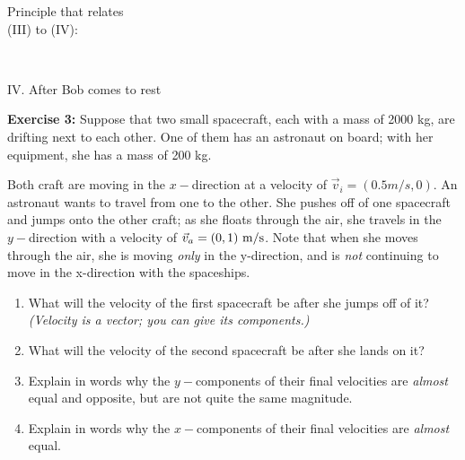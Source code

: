 \documentclass[12pt]{article}
\begin{document}
\begin{minipage}{2in}
	\begin{center}
		\vspace{1.5in}
		Principle that relates\\ (III) to (IV):
	\end{center}
\end{minipage}\\
	\begin{minipage}{5in}
	\begin{framed}
		IV. After Bob comes to rest
		\vspace{1.8in}
	\end{framed}
\end{minipage}
\begin{minipage}{2in}
	\begin{center}
		\vspace{1.5in}
		
	\end{center}
\end{minipage}



\vspace{0.5in}

{\bf Exercise 3:} Suppose that two small spacecraft, each with a mass of 2000 kg, are drifting next to each other. One of them has an astronaut on board; with her equipment, she has a mass of 200 kg. 

	Both craft are moving in the $x-$direction at a velocity of $\vec v_i = (0.5 m/s, 0)$. An astronaut wants to travel from one to the other. She pushes off of one spacecraft and jumps onto the other craft; as she floats through the air, she travels in the $y-$direction with a velocity of $\vec v_a = (0, 1) ~\rm m/\rm s$. Note that when she moves through the air, she is moving {\it only} in the y-direction, and is {\it not} continuing to move in the x-direction with the spaceships.


		\begin{enumerate}
			\item What will the velocity of the first spacecraft be after she jumps off of it? {\it (Velocity is a vector; you can give its components.)}
			
			\vspace{2.5in}\newpage
			
			\item What will the velocity of the second spacecraft be after she lands on it?
			
			\vspace{3.5in}
			
			\item Explain in words why the $y-$components of their final velocities are {\it almost} equal and opposite, but are not quite the same magnitude.
			
			\vspace{2in}
			
			\item Explain in words why the $x-$components of their final velocities are {\it almost} equal. 
		\end{enumerate}

\newpage


   
\end{document}
